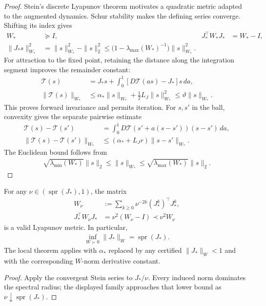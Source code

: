 \begin{proof}
Stein's discrete Lyapunov theorem \citep[Theorem~1]{stein1952iterants} motivates a quadratic metric adapted to the augmented dynamics. Schur stability makes the defining series converge. Shifting its index gives
\begin{align}
 W_*&\succeq I,&J_*^\top W_*J_*&=W_*-I,\\
 \|J_*s\|_{W_*}^2
 &=\|s\|_{W_*}^2-\|s\|_2^2
 \le\bigl(1-\lambda_{\max}(W_*)^{-1}\bigr)\|s\|_{W_*}^2.
\end{align}
For attraction to the fixed point, retaining the distance along the integration segment improves the remainder constant:
\begin{align}
 \mathcal T(s)&=J_*s+\int_0^1[D\mathcal T(as)-J_*]s\,da,\\
 \|\mathcal T(s)\|_{W_*}
 &\le\alpha_*\|s\|_{W_*}+\tfrac12L_J\|s\|_{W_*}^2
 \le\vartheta\|s\|_{W_*}.
\end{align}
This proves forward invariance and permits iteration. For $s,s'$ in the ball, convexity gives the separate pairwise estimate
\begin{align}
 \mathcal T(s)-\mathcal T(s')
 &=\int_0^1D\mathcal T(s'+a(s-s'))(s-s')\,da,\\
 \|\mathcal T(s)-\mathcal T(s')\|_{W_*}
 &\le(\alpha_*+L_Jr)\|s-s'\|_{W_*}.
\end{align}
The Euclidean bound follows from
\begin{align}
 \sqrt{\lambda_{\min}(W_*)}\|s\|_2
 \le\|s\|_{W_*}\le\sqrt{\lambda_{\max}(W_*)}\|s\|_2.
\end{align}
\end{proof}

\begin{corollary}
\label{cor:sharp-quadratic-metric}
For any $\nu\in(\operatorname{spr}(J_*),1)$, the matrix
\begin{align}
 W_\nu&:=\sum_{k\ge0}\nu^{-2k}(J_*^k)^\top J_*^k,\\
 J_*^\top W_\nu J_*&=\nu^2(W_\nu-I)\prec\nu^2W_\nu
\end{align}
is a valid Lyapunov metric. In particular,
\begin{align}
 \inf_{W\succ0}\|J_*\|_W=\operatorname{spr}(J_*).
\end{align}
The local theorem applies with $\alpha_*$ replaced by any certified $\|J_*\|_W<1$ and with the corresponding $W$-norm derivative constant.
\end{corollary}
\begin{proof}
Apply the convergent Stein series to $J_*/\nu$. Every induced norm dominates the spectral radius; the displayed family approaches that lower bound as $\nu\downarrow\operatorname{spr}(J_*)$.
\end{proof}

